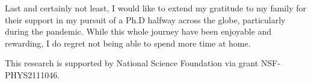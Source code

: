 \documentclass[../main.tex]{subfiles}
\begin{document}
\begin{acknowledgments}
	Last and certainly not least, I would like to extend my gratitude to my family
	for their support in my pursuit of a Ph.D halfway across the globe, particularly
	during the pandemic. While this whole journey have been enjoyable and rewarding,
	I do regret not being able to spend more time at home.

	This research is supported by National Science Foundation via grant NSF-PHYS2111046.

\end{acknowledgments}
\end{document}
